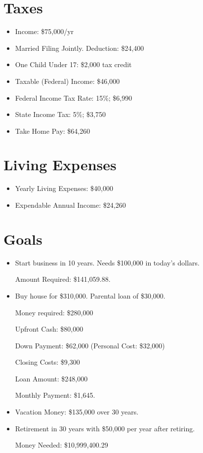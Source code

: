 \documentclass[leqno]{article}
\theoremstyle{definition}
\theoremstyle{remark}
\begin{document}
\section{Taxes}
   \begin{itemize}
       \item Income: \$75,000/yr
       \item Married Filing Jointly. Deduction: \$24,400
       \item One Child Under 17: \$2,000 tax credit
       \item Taxable (Federal) Income: \$46,000
       \item Federal Income Tax Rate: 15\%; \$6,990
       \item State Income Tax: 5\%; \$3,750
       \item Take Home Pay: \$64,260
   \end{itemize}
 \section{Living Expenses}
    \begin{itemize}
        \item Yearly Living Expenses: \$40,000
        \item Expendable Annual Income: \$24,260
    \end{itemize} 
\section{Goals}
    \begin{itemize}
        \item Start business in 10 years. Needs \$100,000 in today's dollars.\par Amount Required: \$141,059.88.
        \item Buy house for \$310,000. Parental loan of \$30,000.\par Money required: \$280,000\par Upfront Cash: \$80,000\par Down Payment: \$62,000 (Personal Cost: \$32,000)\par Closing Costs: \$9,300\par Loan Amount: \$248,000\par Monthly Payment: \$1,645.
        \item Vacation Money: \$135,000 over 30 years.
        \item Retirement in 30 years with \$50,000 per year after retiring. \par Money Needed: \$10,999,400.29
    \end{itemize}
\end{document}
